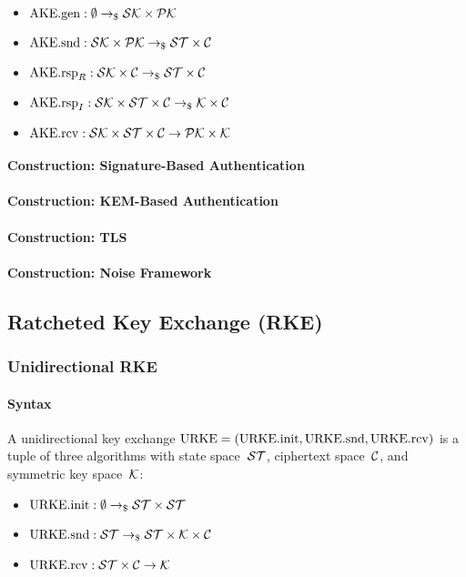 \documentclass[a4paper,orivec]{llncs}
\begin{document}
\begin{itemize}
    \item $\mathrm{AKE}.\mathrm{gen}: \emptyset \to_\$ \mathcal{SK}\times\mathcal{PK}$
    \item $\mathrm{AKE}.\mathrm{snd}: \mathcal{SK}\times\mathcal{PK} \to_\$ \mathcal{ST}\times\mathcal{C}$
    \item $\mathrm{AKE}.\mathrm{rsp}_R: \mathcal{SK}\times\mathcal{C} \to_\$ \mathcal{ST}\times\mathcal{C}$
    \item $\mathrm{AKE}.\mathrm{rsp}_I: \mathcal{SK}\times\mathcal{ST}\times\mathcal{C} \to_\$ \mathcal{K}\times\mathcal{C}$
    \item $\mathrm{AKE}.\mathrm{rcv}: \mathcal{SK}\times\mathcal{ST}\times\mathcal{C} \to \mathcal{PK}\times\mathcal{K}$
\end{itemize}

\paragraph{Construction: Signature-Based Authentication}

\paragraph{Construction: KEM-Based Authentication}

\paragraph{Construction: TLS}

\paragraph{Construction: Noise Framework}


\subsection{Ratcheted Key Exchange (RKE)}

\subsubsection{Unidirectional RKE}

\paragraph{Syntax}
A unidirectional key exchange $\mathrm{URKE}=(\mathrm{URKE}.\mathrm{init},\mathrm{URKE}.\mathrm{snd},\mathrm{URKE}.\mathrm{rcv})$ is a tuple of three algorithms with state space~$\mathcal{ST}$, ciphertext space~$\mathcal{C}$, and symmetric key space~$\mathcal{K}$:

\begin{itemize}
    \item $\mathrm{URKE}.\mathrm{init}: \emptyset \to_\$ \mathcal{ST}\times\mathcal{ST}$
    \item $\mathrm{URKE}.\mathrm{snd}: \mathcal{ST} \to_\$ \mathcal{ST}\times\mathcal{K}\times\mathcal{C}$
    \item $\mathrm{URKE}.\mathrm{rcv}: \mathcal{ST}\times\mathcal{C} \to \mathcal{K}$
\end{itemize}
\end{document}
